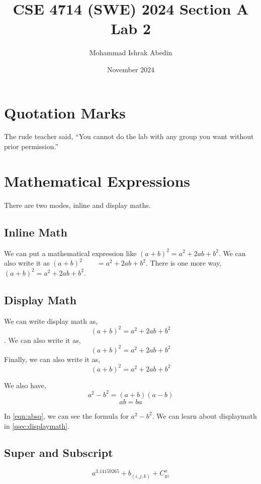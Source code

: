 \documentclass[12pt, a4paper]{article}
\title{CSE 4714 (SWE) 2024 Section A Lab 2}
\author{Mohammad Ishrak Abedin}
\date{November 2024}
\begin{document}
\maketitle

\section{Quotation Marks}

The rude teacher said, ``You cannot do the lab with any group you want without prior permission.''

\section{Mathematical Expressions}
There are two modes, inline and display maths.

\subsection{Inline Math}
We can put a mathematical expression like $(a + b)^2 = a^2 + 2ab + b^2$. We can also write it as \( (a + b)^2\qquad = a^2 + 2ab + b^2  \). There is one more way, 
\begin{math}
    (a + b)^2 = a^2 + 2ab + b^2
\end{math}.

\subsection{Display Math} \label{ssec:displaymath}
We can write display math as, \[ (a + b)^2 = a^2 + 2ab + b^2 \]. We can also write it as, \begin{displaymath}
    (a + b)^2 = a^2 + 2ab + b^2
\end{displaymath}
Finally, we can also write it as,
\begin{equation}
    (a + b)^2 = a^2 + 2ab + b^2
\end{equation}

We also have,
\begin{equation} \label{eqn:absq}
    a ^ 2 - b ^ 2 = (a + b)(a - b)
\end{equation}
\begin{equation}
    ab = ba
\end{equation}

In \autoref{eqn:absq}, we can see the formula for $a^2 - b^2$. We can learn about displaymath in \autoref{ssec:displaymath}.

\subsection{Super and Subscript}
\begin{equation}
    a^{3.14159265} + b_{(i, j, k)} + C^{x}_{yz}
\end{equation}
\end{document}
